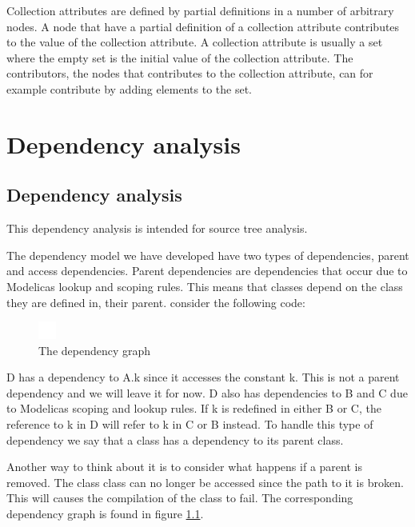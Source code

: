 \documentclass{cslthse-msc}
\begin{document}
Collection attributes are defined by partial definitions in a number of arbitrary nodes. A node that have a partial definition of a collection attribute contributes to the value of the collection attribute. A collection attribute is usually a set where the empty set is the initial value of the collection attribute. The contributors, the nodes that contributes to the collection attribute, can for example contribute by adding elements to the set.~\cite{magnusson2007extending}

\chapter[Dependency analysis]{Dependency analysis}

\section{Dependency analysis}

This dependency analysis is intended for source tree analysis.

The dependency model we have developed have two types of dependencies, parent and access dependencies. Parent dependencies are dependencies that occur due to Modelicas lookup and scoping rules. This means that classes depend on the class they are defined in, their parent. consider the following code:


\begin{figure}
    \centering
    \includegraphics[]{EPS-graphs/parent1.eps}
  \caption{The dependency graph}
  \label{fig:parent1graph}
\end{figure}

D has a dependency to A.k since it accesses the constant k. This is not a parent dependency and we will leave it for now. D also has dependencies to B and C due to Modelicas scoping and lookup rules. If k is redefined in either B or C, the reference to k in D will refer to k in C or B instead. To handle this type of dependency we say that a class has a dependency to its parent class.

Another way to think about it is to consider what happens if a parent is removed. The class class can no longer be accessed since the path to it is broken. This will causes the compilation of the class to fail. The corresponding dependency graph is found in figure \ref{fig:parent1graph}.
\end{document}
